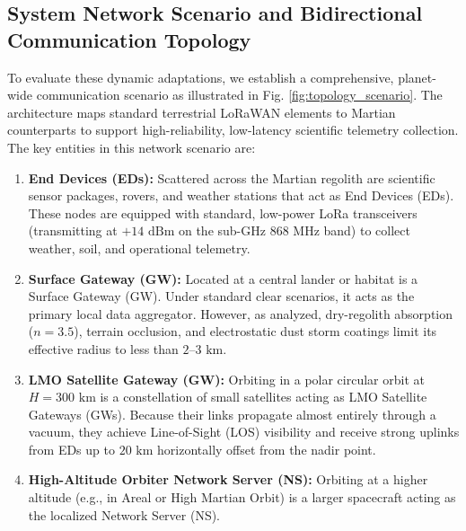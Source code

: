 \documentclass{ijuc}
\begin{document}
\subsection{System Network Scenario and Bidirectional Communication Topology}
To evaluate these dynamic adaptations, we establish a comprehensive, planet-wide communication scenario as illustrated in Fig. \ref{fig:topology_scenario}. The architecture maps standard terrestrial LoRaWAN elements to Martian counterparts to support high-reliability, low-latency scientific telemetry collection. The key entities in this network scenario are:
\begin{enumerate}
    \item \textbf{End Devices (EDs):} Scattered across the Martian regolith are scientific sensor packages, rovers, and weather stations that act as End Devices (EDs). These nodes are equipped with standard, low-power LoRa transceivers (transmitting at $+14\text{ dBm}$ on the sub-GHz $868\text{ MHz}$ band) to collect weather, soil, and operational telemetry.
    \item \textbf{Surface Gateway (GW):} Located at a central lander or habitat is a Surface Gateway (GW). Under standard clear scenarios, it acts as the primary local data aggregator. However, as analyzed, dry-regolith absorption ($n=3.5$), terrain occlusion, and electrostatic dust storm coatings limit its effective radius to less than $2\text{--}3\text{ km}$.
    \item \textbf{LMO Satellite Gateway (GW):} Orbiting in a polar circular orbit at $H = 300\text{ km}$ is a constellation of small satellites acting as LMO Satellite Gateways (GWs). Because their links propagate almost entirely through a vacuum, they achieve Line-of-Sight (LOS) visibility and receive strong uplinks from EDs up to $20\text{ km}$ horizontally offset from the nadir point.
    \item \textbf{High-Altitude Orbiter Network Server (NS):} Orbiting at a higher altitude (e.g., in Areal or High Martian Orbit) is a larger spacecraft acting as the localized Network Server (NS). 
\end{enumerate}
\end{document}
